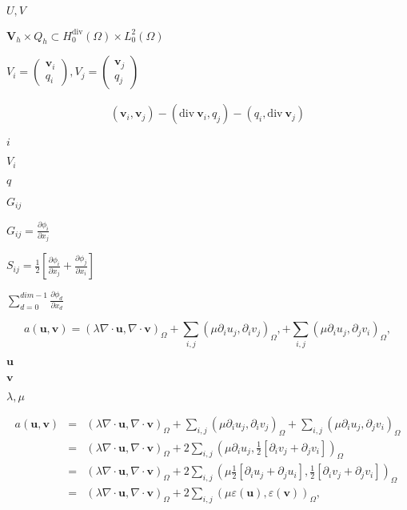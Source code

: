 \documentclass{article}
\begin{document}
$U,V$
\pagebreak

$\mathbf V_h \times Q_h \subset H^{\text{div}}_0(\Omega) \times L^2_0(\Omega)$
\pagebreak

$V_i=\left(\begin{array}{c}\mathbf v_i \\ q_i\end{array}\right), V_j=\left(\begin{array}{c}\mathbf v_j \\ q_j\end{array}\right)$
\pagebreak

\begin{eqnarray*} (\mathbf v_i, \mathbf v_j) - (\mathrm{div}\ \mathbf v_i, q_j) - (q_i, \mathrm{div}\ \mathbf v_j) \end{eqnarray*}
\pagebreak

$i$
\pagebreak

$V_i$
\pagebreak

$q$
\pagebreak

$G_{ij}$
\pagebreak

$G_{ij}=\frac{\partial\phi_i}{\partial x_j}$
\pagebreak

$S_{ij}=\frac 12 \left[\frac{\partial\phi_i}{\partial x_j} + \frac{\partial\phi_j}{\partial x_i}\right]$
\pagebreak

$\sum_{d=0}^{dim-1} \frac{\partial\phi_d}{\partial x_d}$
\pagebreak

\[ a({\mathbf u}, {\mathbf v}) = \left( \lambda \nabla\cdot {\mathbf u}, \nabla\cdot {\mathbf v} \right)_\Omega + \sum_{i,j} \left( \mu \partial_i u_j, \partial_i v_j \right)_\Omega, + \sum_{i,j} \left( \mu \partial_i u_j, \partial_j v_i \right)_\Omega, \]
\pagebreak

$\mathbf u$
\pagebreak

$\mathbf v$
\pagebreak

$\lambda,\mu$
\pagebreak

\begin{eqnarray*} a({\mathbf u}, {\mathbf v}) &=& \left( \lambda \nabla\cdot {\mathbf u}, \nabla\cdot {\mathbf v} \right)_\Omega + \sum_{i,j} \left( \mu \partial_i u_j, \partial_i v_j \right)_\Omega + \sum_{i,j} \left( \mu \partial_i u_j, \partial_j v_i \right)_\Omega \\ &=& \left( \lambda \nabla\cdot {\mathbf u}, \nabla\cdot {\mathbf v} \right)_\Omega + 2 \sum_{i,j} \left( \mu \partial_i u_j, \frac 12[\partial_i v_j + \partial_j v_i] \right)_\Omega \\ &=& \left( \lambda \nabla\cdot {\mathbf u}, \nabla\cdot {\mathbf v} \right)_\Omega + 2 \sum_{i,j} \left( \mu \frac 12[\partial_i u_j + \partial_j u_i], \frac 12[\partial_i v_j + \partial_j v_i] \right)_\Omega \\ &=& \left( \lambda \nabla\cdot {\mathbf u}, \nabla\cdot {\mathbf v} \right)_\Omega + 2 \sum_{i,j} \left( \mu \varepsilon(\mathbf u), \varepsilon(\mathbf v) \right)_\Omega, \end{eqnarray*}
\pagebreak
\end{document}
